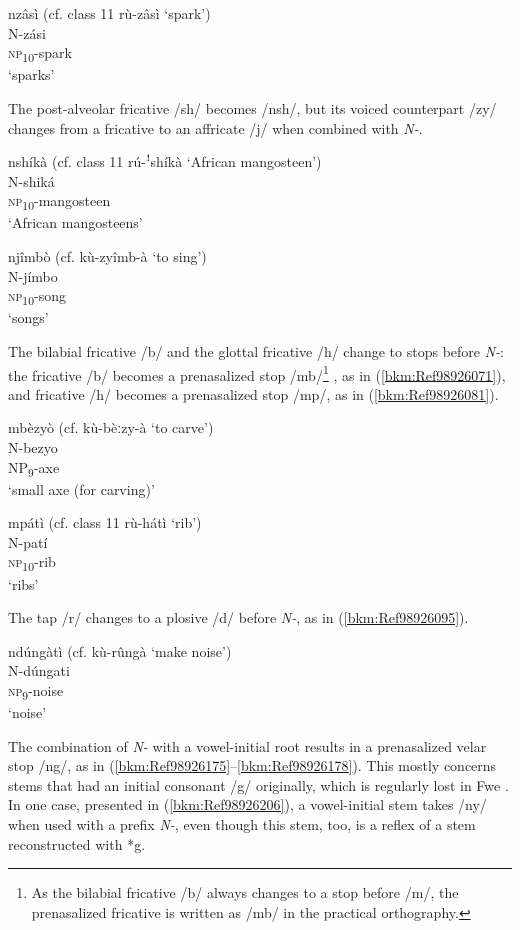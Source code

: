 \ea
\label{bkm:Ref498095623}
nzâsì (cf. class 11 rù-zâsì ‘spark’)\\
N-zási\\
\textsc{np}\-\textsubscript{10}-spark\\
\glt ‘sparks’
\z

The post-alveolar fricative /sh/ becomes /nsh/, but its voiced counterpart /zy/ changes from a fric\-ative to an affricate /j/ when combined with \textit{N-}.

\ea
nshíkà (cf. class 11 rú-ꜝshíkà ‘African mangosteen’)\\
N-shiká\\
\textsc{np}\textsubscript{10}-mangosteen\\
\glt ‘African mangosteens’
\z

\ea
njîmbò (cf. kù-zyîmb-à ‘to sing’)\\
N-jímbo\\
\textsc{np}\textsubscript{10}-song \\
\glt ‘songs’
\z

The bilabial fricative /b/ and the glottal fricative /h/ change to stops before \textit{N-}: the fricative /b/ be\-comes a prenasalized stop /mb/\footnote{As the bilabial fricative /b/ always changes to a stop before /m/, the prenasalized fricative is written as /mb/ in the practical orthography.} , as in (\ref{bkm:Ref98926071}), and fricative /h/ becomes a prenasalized stop /mp/, as in (\ref{bkm:Ref98926081}).

\ea
\label{bkm:Ref98926071}
mbèzyò (cf. kù-bèːzy-à ‘to carve’)\\
N-bezyo\\
NP\textsubscript{9}-axe\\
\glt ‘small axe (for carving)’
\z

\ea
\label{bkm:Ref98926081}
mpátì (cf. class 11 rù-hátì ‘rib’)\\
N-patí\\
\textsc{np}\textsubscript{10}-rib\\
\glt ‘ribs’
\z

The tap /r/ changes to a plosive /d/ before \textit{N-}, as in (\ref{bkm:Ref98926095}).

\ea
\label{bkm:Ref98926095}
ndúngàtì (cf. kù-rûngà ‘make noise’)\\
N-dúngati\\
\textsc{np}\textsubscript{9}-noise\\
\glt ‘noise’
\z

The combination of \textit{N-} with a vowel-initial root results in a prenasalized velar stop /ng/, as in (\ref{bkm:Ref98926175}--\ref{bkm:Ref98926178}). This mostly concerns stems that had an initial consonant /g/ originally, which is regularly lost in Fwe \citep[115]{Bostoen2009}. In one case, presented in (\ref{bkm:Ref98926206}), a vowel-initial stem takes /ny/ when used with a prefix \textit{N-}, even though this stem, too, is a reflex of a stem reconstructed with *g.

